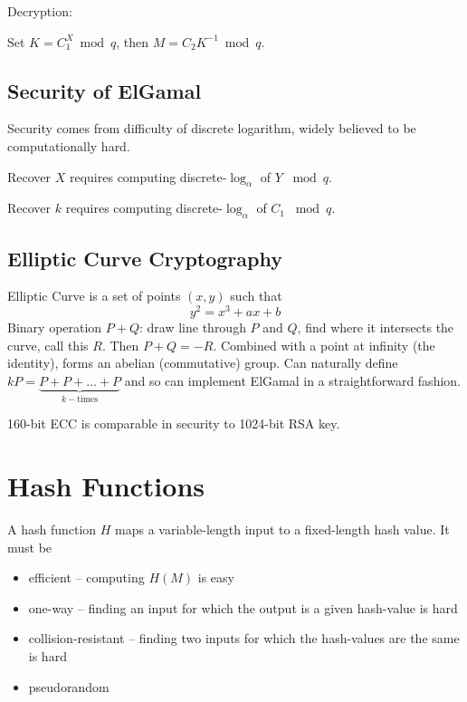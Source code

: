 \documentclass[draft]{article}
\begin{document}
Decryption:

Set $K=C_1^X\bmod{q}$, then $M = C_2K^{-1}\bmod{q}$.

\subsection{Security of ElGamal}
Security comes from difficulty of discrete logarithm, widely believed to be computationally hard.

Recover $X$ requires computing discrete-$\log_{\alpha}$ of $Y$ $\bmod{q}$.

Recover $k$ requires computing discrete-$\log_{\alpha}$ of $C_1$ $\bmod{q}$.
\subsection{Elliptic Curve Cryptography}
Elliptic Curve is a set of points $(x,y)$ such that \[y^2=x^3+ax+b\] Binary operation $P + Q$: draw line through $P$ and $Q$, find where it intersects the curve, call this $R$. Then $P+Q = -R$. Combined with a point at infinity (the identity), forms an abelian (commutative) group. Can naturally define $kP = \underbrace{P + P + \dots + P}_{k-\text{times}}$ and so can implement ElGamal in a straightforward fashion.

160-bit ECC is comparable in security to 1024-bit RSA key.
\section{Hash Functions}
A hash function $H$ maps a variable-length input to a fixed-length hash value. It must be
\begin{itemize}[nosep]
    \item efficient -- computing $H(M)$ is easy
    \item one-way -- finding an input for which the output is a given hash-value is hard
    \item collision-resistant -- finding two inputs for which the hash-values are the same is hard
    \item pseudorandom
\end{itemize}
\end{document}
